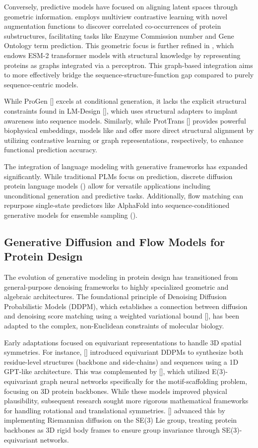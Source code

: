 \documentclass[11pt]{article}
\begin{document}
Conversely, predictive models have focused on aligning latent spaces through geometric information. \citep{2203.06125} employs multiview contrastive learning with novel augmentation functions to discover correlated co-occurrences of protein substructures, facilitating tasks like Enzyme Commission number and Gene Ontology term prediction. This geometric focus is further refined in \citep{2401.14819}, which endows ESM-2 transformer models with structural knowledge by representing proteins as graphs integrated via a perceptron. This graph-based integration aims to more effectively bridge the sequence-structure-function gap compared to purely sequence-centric models.

While ProGen [\citep{2004.03497}] excels at conditional generation, it lacks the explicit structural constraints found in LM-Design [\citep{2302.01649}], which uses structural adapters to implant awareness into sequence models. Similarly, while ProtTrans [\citep{2007.06225}] provides powerful biophysical embeddings, models like \citep{2203.06125} and \citep{2401.14819} offer more direct structural alignment by utilizing contrastive learning or graph representations, respectively, to enhance functional prediction accuracy.

The integration of language modeling with generative frameworks has expanded significantly. While traditional PLMs focus on prediction, discrete diffusion protein language models (\citep{2402.18567}) allow for versatile applications including unconditional generation and predictive tasks. Additionally, flow matching can repurpose single-state predictors like AlphaFold into sequence-conditioned generative models for ensemble sampling (\citep{2402.04845}).
\subsection{Generative Diffusion and Flow Models for Protein Design}

The evolution of generative modeling in protein design has transitioned from general-purpose denoising frameworks to highly specialized geometric and algebraic architectures. The foundational principle of Denoising Diffusion Probabilistic Models (DDPM), which establishes a connection between diffusion and denoising score matching using a weighted variational bound [\citep{2006.11239}], has been adapted to the complex, non-Euclidean constraints of molecular biology.

Early adaptations focused on equivariant representations to handle 3D spatial symmetries. For instance, [\citep{2205.15019}] introduced equivariant DDPMs to synthesize both residue-level structures (backbone and side-chains) and sequences using a 1D GPT-like architecture. This was complemented by [\citep{2206.04119}], which utilized E(3)-equivariant graph neural networks specifically for the motif-scaffolding problem, focusing on 3D protein backbones. While these models improved physical plausibility, subsequent research sought more rigorous mathematical frameworks for handling rotational and translational symmetries. [\citep{2302.02277}] advanced this by implementing Riemannian diffusion on the SE(3) Lie group, treating protein backbones as 3D rigid body frames to ensure group invariance through SE(3)-equivariant networks.
\end{document}
